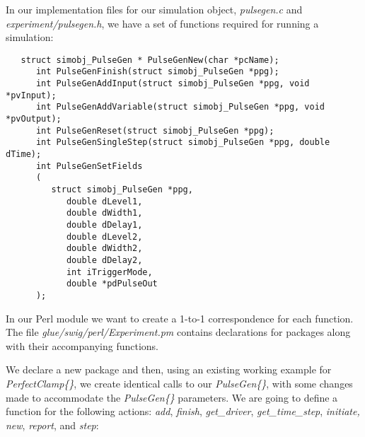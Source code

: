 \documentclass[12pt]{article}
\begin{document}
In our implementation files for our simulation object, {\it pulsegen.c} and {\it experiment/pulsegen.h}, we have a set of functions required for running a simulation:
\begin{verbatim}
   struct simobj_PulseGen * PulseGenNew(char *pcName);
      int PulseGenFinish(struct simobj_PulseGen *ppg);
      int PulseGenAddInput(struct simobj_PulseGen *ppg, void *pvInput);
      int PulseGenAddVariable(struct simobj_PulseGen *ppg, void *pvOutput);
      int PulseGenReset(struct simobj_PulseGen *ppg);
      int PulseGenSingleStep(struct simobj_PulseGen *ppg, double dTime);
      int PulseGenSetFields
      (
         struct simobj_PulseGen *ppg,
            double dLevel1,
            double dWidth1,
            double dDelay1,
            double dLevel2,
            double dWidth2,
            double dDelay2,
            int iTriggerMode,
            double *pdPulseOut
      );
\end{verbatim}
In our Perl module we want to create a 1-to-1 correspondence for each function. The file {\it glue/swig/perl/Experiment.pm} contains declarations for packages along with their accompanying functions.

We declare a new package and then, using an existing working example for {\it PerfectClamp\{\}}, we create identical calls to our {\it PulseGen\{\}}, with some changes made to accommodate the {\it PulseGen\{\}} parameters. We are going to define a function for the following actions: {\it add}, {\it finish}, {\it get\_driver}, {\it get\_time\_step}, {\it initiate, new}, {\it report}, and {\it step}:
\end{document}
